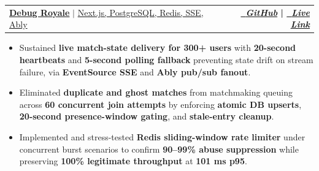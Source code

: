\documentclass[letterpaper,9pt]{article}
\makeatletter
\newcommand{\resumeItem}[1]{
  \item\small{
    {#1 \vspace{-2pt}}
  }
}
\newcommand{\resumeProjectHeading}[2]{
    \item
    \begin{tabular*}{1.001\textwidth}{l@{\extracolsep{\fill}}r}
      \small#1 & \textbf{\small #2}\\
    \end{tabular*}\vspace{-7pt}
}
\newcommand{\resumeItemListStart}{\begin{itemize}}
\newcommand{\resumeItemListEnd}{\end{itemize}\vspace{-5pt}}
\makeatother
\begin{document}
\resumeProjectHeading
{{\textbf{\large{\underline{Debug Royale}}} } $|$ \large{\underline{Next.js, PostgreSQL, Redis, SSE, Ably}}}{\href{https://github.com/PriyamJChakrabarty/Debug-Battle}{\raisebox{-0.1\height}\faGithub\ \textit{GitHub}} | \href{https://debug-battle-roan.vercel.app/}{\raisebox{-0.1\height}\faExternalLink\ \textit{Live Link}}}
\resumeItemListStart
\resumeItem{\normalsize{Sustained \textbf{live match-state delivery for 300+ users} with \textbf{20-second heartbeats} and \textbf{5-second polling fallback} preventing state drift on stream failure, via \textbf{EventSource SSE} and \textbf{Ably pub/sub fanout}.}}
\resumeItem{\normalsize{Eliminated \textbf{duplicate and ghost matches} from matchmaking queuing across \textbf{60 concurrent join attempts} by enforcing \textbf{atomic DB upserts}, \textbf{20-second presence-window gating}, and \textbf{stale-entry cleanup}.}}
\resumeItem{\normalsize{Implemented and stress-tested \textbf{Redis sliding-window rate limiter} under concurrent burst scenarios to confirm \textbf{90--99\% abuse suppression} while preserving \textbf{100\% legitimate throughput} at \textbf{101 ms p95}.}}
\resumeItemListEnd






  
\end{document}
